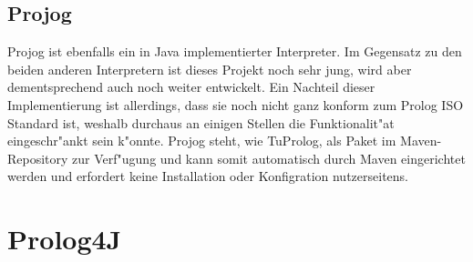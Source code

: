 \subsection{Projog}
Projog\cite{projog} ist ebenfalls ein in Java implementierter Interpreter. Im Gegensatz zu den beiden anderen Interpretern ist dieses Projekt noch sehr jung, wird aber dementsprechend auch noch weiter entwickelt. Ein Nachteil dieser Implementierung ist allerdings, dass sie noch nicht ganz konform zum Prolog ISO Standard ist, weshalb durchaus an einigen Stellen die Funktionalit"at eingeschr"ankt sein k"onnte. Projog steht, wie TuProlog, als Paket im Maven-Repository zur Verf"ugung und kann somit automatisch durch Maven eingerichtet werden und erfordert keine Installation oder Konfigration nutzerseitens.

\section{Prolog4J}